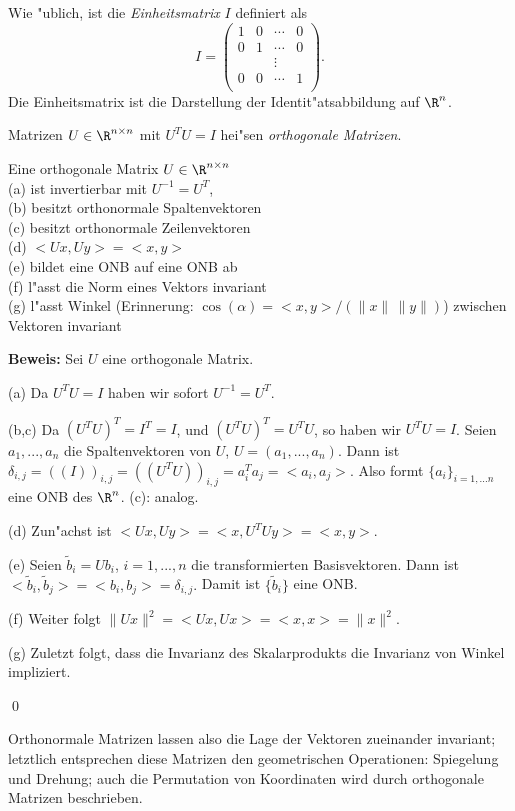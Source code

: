 Wie "ublich, ist die  \emph{Einheitsmatrix} $I$ definiert als 
$$ I = \left(\begin{array}{cccc}
1 & 0& \cdots & 0\\
0 & 1& \cdots & 0\\
               &             & \vdots &                \\
0 & 0 & \cdots & 1\\  
\end{array}\right).
$$
Die Einheitsmatrix ist die Darstellung der Identit"atsabbildung auf $\R^n$.

\begin{sdefi} 
Matrizen $U\in \R^{n\times n}$ mit 
$ U^T U = I$
hei"sen \emph{orthogonale Matrizen}.
\end{sdefi}


\begin{slemma} Eine orthogonale Matrix $U\in\R^{n\times n}$\\
(a) ist invertierbar mit $U^{-1}=U^T$,\\
(b) besitzt orthonormale Spaltenvektoren\\
(c) besitzt orthonormale Zeilenvektoren\\
(d) $<Ux, Uy> = <x,y>$\\
(e) bildet eine ONB auf eine ONB ab\\
(f) l"asst die Norm eines Vektors invariant\\
(g) l"asst Winkel (Erinnerung: $\cos(\alpha) = <x,y>/(\|x\|\,\|y\|)$) zwischen Vektoren invariant
\end{slemma}
{\bf Beweis: } Sei $U$ eine orthogonale Matrix. \par 
(a) Da $U^T U = I$ haben wir sofort $U^{-1} = U^T$.\par
(b,c) Da $(U^TU)^T = I^T = I$, und $(U^TU)^T = U^TU$, so haben wir $U^TU=I$. 
Seien $a_1,...,a_n$ die Spaltenvektoren von $U$,  $U=(a_1,...,a_n)$. Dann ist 
$ \delta_{i,j} = ((I))_{i,j} = ((U^TU))_{i,j} = a_i^T a_j = <a_i, a_j>.$
Also formt $\{a_i\}_{i=1,...n}$ eine ONB des $\R^n$. (c): analog.\par
(d) Zun"achst ist $ <Ux,Uy> = <x, U^TUy> = <x,y>$.\par
(e) Seien $\tilde b_i = U b_i$, $i=1,...,n$ die transformierten Basisvektoren. 
Dann ist $ <\tilde b_i, \tilde b_j>  = <b_i, b_j> = \delta_{i,j}.$ Damit ist
 $\{\tilde b_i\}$ eine ONB.\par
(f) Weiter folgt $\|Ux\|^2 = <Ux, Ux> =   <x,x> = \|x\|^2$.\par
(g) Zuletzt folgt, dass die Invarianz des Skalarprodukts die Invarianz von Winkel 
impliziert.
\par\qed
\begin{sbem}
Orthonormale Matrizen lassen also die Lage der Vektoren zueinander invariant; letztlich entsprechen diese Matrizen den geometrischen Operationen: Spiegelung und Drehung; auch die Permutation von Koordinaten wird durch orthogonale Matrizen beschrieben.
\end{sbem}

